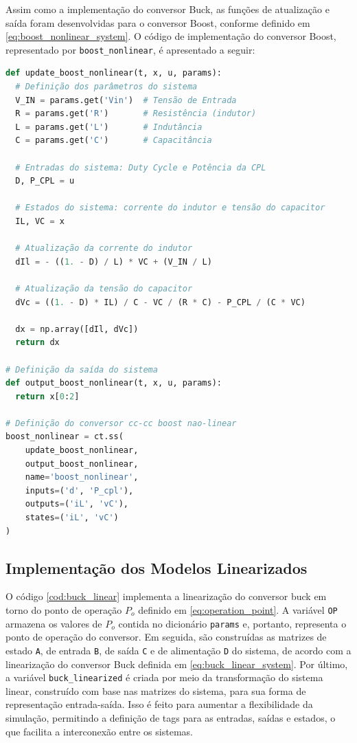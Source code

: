 Assim como a implementação do conversor Buck, as funções de atualização e saída foram desenvolvidas para o conversor Boost, conforme definido em \eqref{eq:boost_nonlinear_system}. O código de implementação do conversor Boost, representado por \texttt{boost\_nonlinear}, é apresentado a seguir:
\vspace{8pt}

\begin{lstlisting}[language=Python, caption={Implementação do conversor Boost não linear.}, label=cod:boost_nonlinear]
  def update_boost_nonlinear(t, x, u, params):
  # Definição dos parâmetros do sistema
  V_IN = params.get('Vin')  # Tensão de Entrada
  R = params.get('R')       # Resistência (indutor)
  L = params.get('L')       # Indutância
  C = params.get('C')       # Capacitância

  # Entradas do sistema: Duty Cycle e Potência da CPL
  D, P_CPL = u

  # Estados do sistema: corrente do indutor e tensão do capacitor
  IL, VC = x

  # Atualização da corrente do indutor
  dIl = - ((1. - D) / L) * VC + (V_IN / L)
  
  # Atualização da tensão do capacitor
  dVc = ((1. - D) * IL) / C - VC / (R * C) - P_CPL / (C * VC)

  dx = np.array([dIl, dVc])
  return dx

# Definição da saída do sistema
def output_boost_nonlinear(t, x, u, params):
  return x[0:2]

# Definição do conversor cc-cc boost nao-linear
boost_nonlinear = ct.ss(
    update_boost_nonlinear, 
    output_boost_nonlinear,
    name='boost_nonlinear',
    inputs=('d', 'P_cpl'),
    outputs=('iL', 'vC'),
    states=('iL', 'vC')
)
\end{lstlisting}

\subsection{Implementação dos Modelos Linearizados} \label{subsection:implementation_of_linear_models}

O código \ref{cod:buck_linear} implementa a linearização do conversor buck em torno do ponto de operação $P_o$ definido em \eqref{eq:operation_point}. A variável \texttt{OP} armazena os valores de $P_o$ contida no dicionário \texttt{params} e, portanto, representa o ponto de operação do conversor. Em seguida, são construídas as matrizes de estado \texttt{A}, de entrada \texttt{B}, de saída \texttt{C} e de alimentação \texttt{D} do sistema, de acordo com a linearização do conversor Buck definida em \eqref{eq:buck_linear_system}. Por último, a variável \texttt{buck\_linearized} é criada por meio da transformação do sistema linear, construído com base nas matrizes do sistema, para sua forma de representação entrada-saída. Isso é feito para aumentar a flexibilidade da simulação, permitindo a definição de tags para as entradas, saídas e estados, o que facilita a interconexão entre os sistemas.

